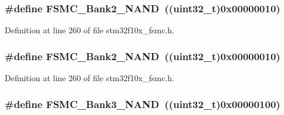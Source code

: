 \subsubsection[{\texorpdfstring{F\+S\+M\+C\+\_\+\+Bank2\+\_\+\+N\+A\+ND}{FSMC_Bank2_NAND}}]{\setlength{\rightskip}{0pt plus 5cm}\#define F\+S\+M\+C\+\_\+\+Bank2\+\_\+\+N\+A\+ND~(({\bf uint32\+\_\+t})0x00000010)}\hypertarget{group___f_s_m_c___n_a_n_d___bank_ga294e7134aa329a09e56b61eec9882a27}{}\label{group___f_s_m_c___n_a_n_d___bank_ga294e7134aa329a09e56b61eec9882a27}


Definition at line 260 of file stm32f10x\+\_\+fsmc.\+h.

\subsubsection[{\texorpdfstring{F\+S\+M\+C\+\_\+\+Bank2\+\_\+\+N\+A\+ND}{FSMC_Bank2_NAND}}]{\setlength{\rightskip}{0pt plus 5cm}\#define F\+S\+M\+C\+\_\+\+Bank2\+\_\+\+N\+A\+ND~(({\bf uint32\+\_\+t})0x00000010)}\hypertarget{group___f_s_m_c___n_a_n_d___bank_ga294e7134aa329a09e56b61eec9882a27}{}\label{group___f_s_m_c___n_a_n_d___bank_ga294e7134aa329a09e56b61eec9882a27}


Definition at line 260 of file stm32f10x\+\_\+fsmc.\+h.

\subsubsection[{\texorpdfstring{F\+S\+M\+C\+\_\+\+Bank3\+\_\+\+N\+A\+ND}{FSMC_Bank3_NAND}}]{\setlength{\rightskip}{0pt plus 5cm}\#define F\+S\+M\+C\+\_\+\+Bank3\+\_\+\+N\+A\+ND~(({\bf uint32\+\_\+t})0x00000100)}\hypertarget{group___f_s_m_c___n_a_n_d___bank_gaf72def0732c026b0245d721ee371c85b}{}\label{group___f_s_m_c___n_a_n_d___bank_gaf72def0732c026b0245d721ee371c85b}


